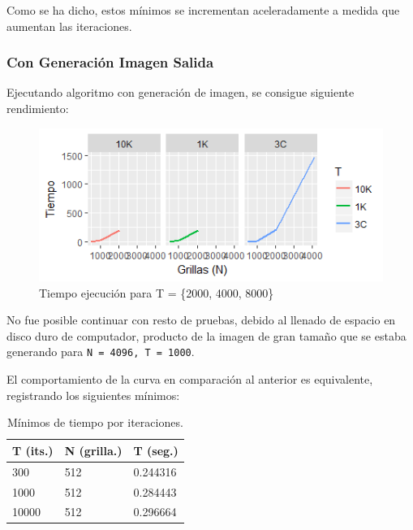\documentclass[jou]{apa6}
\begin{document}
Como se ha dicho, estos mínimos se incrementan aceleradamente a medida que aumentan las iteraciones.

\subsubsection{Con Generación Imagen Salida}
Ejecutando algoritmo con generación de imagen, se consigue siguiente rendimiento:

\begin{figure}[h]
	\includegraphics[width=\columnwidth]{time-same-block-size-with-raw.png}
	\caption{Tiempo ejecución para T = \{2000, 4000, 8000\}}
	\label{fig:Figure2}
\end{figure}

No fue posible continuar con resto de pruebas, debido al llenado de espacio en disco duro de computador, producto de la imagen de gran tamaño que se estaba generando para \texttt{N = 4096, T = 1000}.

El comportamiento de la curva en comparación al anterior es equivalente, registrando los siguientes mínimos:

\begin{table}[h]
\centering
\caption{Mínimos de tiempo por iteraciones.}
\label{my-label}
\begin{tabular}{@{}lll@{}}
\toprule
\multicolumn{1}{c}{T (its.)} & \multicolumn{1}{c}{N (grilla.)} & \multicolumn{1}{c}{T (seg.)} \\ \midrule
300                          & 512                          & 0.244316                     \\
1000                         & 512                          & 0.284443                     \\
10000                        & 512                          & 0.296664                     \\ \bottomrule
\end{tabular}
\end{table}
\end{document}
